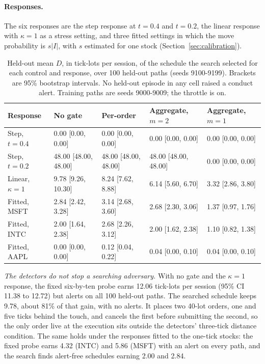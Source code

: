 \documentclass{article}
\begin{document}
\paragraph{Responses.} The six responses are the step response at $t = 0.4$ and $t = 0.2$, the linear response with $\kappa = 1$ as a stress setting, and three fitted settings in which the move probability is $s|I|$, with $s$ estimated for one stock (Section~\ref{sec:calibration}).

\begin{table}[htbp]
\centering
\footnotesize
\setlength{\tabcolsep}{4pt}
\begin{tabular}{lllll}
\toprule
\textbf{Response} & \textbf{No gate} & \textbf{Per-order} & \textbf{Aggregate, $m = 2$} & \textbf{Aggregate, $m = 1$} \\
\midrule
Step, $t = 0.4$ & 0.00 [0.00, 0.00] & 0.00 [0.00, 0.00] & 0.00 [0.00, 0.00] & 0.00 [0.00, 0.00] \\
Step, $t = 0.2$ & 48.00 [48.00, 48.00] & 48.00 [48.00, 48.00] & 48.00 [48.00, 48.00] & 0.00 [0.00, 0.00] \\
Linear, $\kappa = 1$ & 9.78 [9.26, 10.30] & 8.24 [7.62, 8.88] & 6.14 [5.60, 6.70] & 3.32 [2.86, 3.80] \\
Fitted, MSFT & 2.84 [2.42, 3.28] & 3.14 [2.68, 3.60] & 2.68 [2.30, 3.06] & 1.37 [0.97, 1.76] \\
Fitted, INTC & 2.00 [1.64, 2.38] & 2.68 [2.26, 3.12] & 2.00 [1.62, 2.38] & 1.10 [0.82, 1.38] \\
Fitted, AAPL & 0.00 [0.00, 0.00] & 0.12 [0.04, 0.22] & 0.04 [0.00, 0.10] & 0.04 [0.00, 0.10] \\
\bottomrule
\end{tabular}
\caption{Held-out mean $D$, in tick-lots per session, of the schedule the search selected for each control and response, over 100 held-out paths (seeds 9100-9199). Brackets are 95\% bootstrap intervals. No held-out episode in any cell raised a conduct alert. Training paths are seeds 9000-9009; the throttle is on.}
\label{tab:adversary}
\end{table}

\emph{The detectors do not stop a searching adversary.} With no gate and the $\kappa = 1$ response, the fixed six-by-ten probe earns 12.06 tick-lots per session (95\% CI 11.38 to 12.72) but alerts on all 100 held-out paths. The searched schedule keeps 9.78, about 81\% of that gain, with no alerts. It places two 40-lot orders, one and five ticks behind the touch, and cancels the first before submitting the second, so the only order live at the execution sits outside the detectors' three-tick distance condition. The same holds under the responses fitted to the one-tick stocks: the fixed probe earns 4.32 (INTC) and 5.86 (MSFT) with an alert on every path, and the search finds alert-free schedules earning 2.00 and 2.84.
\end{document}
